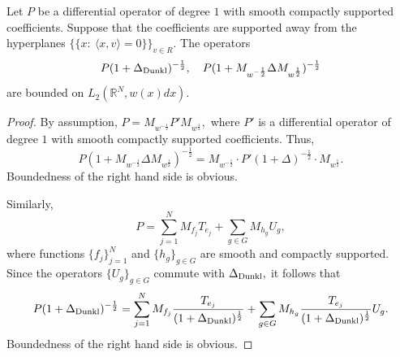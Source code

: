 \documentclass{amsart}
\begin{document}
\begin{lemma}\label{s10 verification lemma} Let $P$ be a differential operator of degree $1$ with smooth compactly supported coefficients. Suppose that the coefficients are supported away from the hyperplanes $\{\{x:\ \langle x,v\rangle=0\}\}_{v\in R}.$ The operators
$$P(1+\Delta_{{\rm Dunkl}})^{-\frac12},\quad P(1+M_{w^{-\frac12}}\Delta M_{w^{\frac12}})^{-\frac12}$$
are bounded on $L_2(\mathbb{R}^N,w(x)dx).$
\end{lemma}
\begin{proof} By assumption, $P=M_{w^{-\frac12}}P'M_{w^{\frac12}},$ where $P'$ is a differential operator of degree $1$ with smooth compactly supported coefficients. Thus,
$$P(1+M_{w^{-\frac12}}\Delta M_{w^{\frac12}})^{-\frac12}=M_{w^{-\frac12}}\cdot P'(1+\Delta)^{-\frac12}\cdot M_{w^{\frac12}}.$$
Boundedness of the right hand side is obvious.

Similarly,
$$P=\sum_{j=1}^NM_{f_j}T_{e_j}+\sum_{g\in G}M_{h_g}U_g,$$
where functions $\{f_j\}_{j=1}^N$ and $\{h_g\}_{g\in G}$ are smooth and compactly supported. Since the operators $\{U_g\}_{g\in G}$ commute with $\Delta_{{\rm Dunkl}},$ it follows that
$$P(1+\Delta_{{\rm Dunkl}})^{-\frac12}=\sum_{j=1}^NM_{f_j}\frac{T_{e_j}}{(1+\Delta_{{\rm Dunkl}})^{\frac12}}+\sum_{g\in G}M_{h_g}\frac{T_{e_j}}{(1+\Delta_{{\rm Dunkl}})^{\frac12}}U_g.$$
Boundedness of the right hand side is obvious.
\end{proof}
\end{document}
